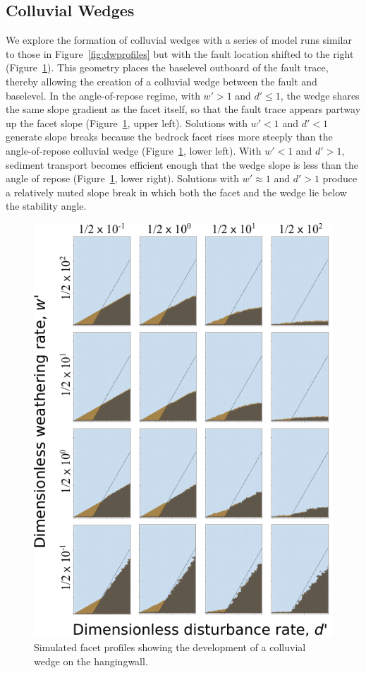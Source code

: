 \subsection{Colluvial Wedges}

We explore the formation of colluvial wedges with a series of model runs similar to those in Figure~\ref{fig:dwprofiles} but with the fault location shifted to the right (Figure~\ref{fig:colluv}). This geometry places the baselevel outboard of the fault trace, thereby allowing the creation of a colluvial wedge between the fault and baselevel. In the angle-of-repose regime, with $w'>1$ and $d'\le 1$, the wedge shares the same slope gradient as the facet itself, so that the fault trace appears partway up the facet slope (Figure~\ref{fig:colluv}, upper left). Solutions with $w'<1$ and $d'<1$ generate slope breaks because the bedrock facet rises more steeply than the angle-of-repose colluvial wedge (Figure~\ref{fig:colluv}, lower left). With $w'<1$ and $d' > 1$, sediment transport becomes efficient enough that the wedge slope is less than the angle of repose  (Figure~\ref{fig:colluv}, lower right). Solutions with $w' \approx 1$ and $d'>1$ produce a relatively muted slope break in which both the facet and the wedge lie below the stability angle.

\begin{figure}[ht!]
\centerline{\includegraphics[scale=1.5]{Figures/four_by_four_profiles_colluvial_wedge.pdf}}
\caption{Simulated facet profiles showing the development of a colluvial wedge on the hangingwall.}
\label{fig:colluv}
\end{figure}


